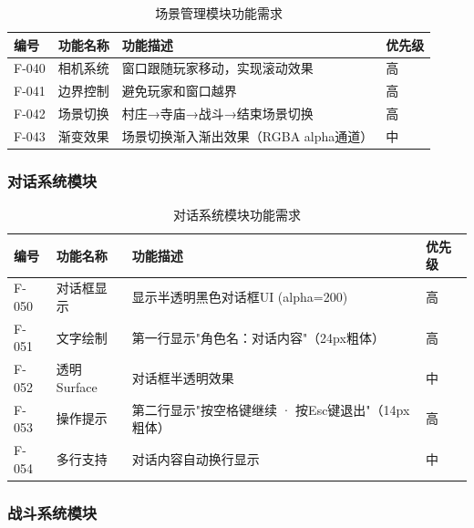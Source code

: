 \documentclass[12pt,a4paper]{article}
\begin{document}
\begin{table}[H]
\centering
\caption{场景管理模块功能需求}
\renewcommand{\arraystretch}{1.3}
\begin{tabularx}{\textwidth}{>{\centering\arraybackslash}m{2cm}>{\centering\arraybackslash}m{3cm}>{\centering\arraybackslash}m{5cm}>{\centering\arraybackslash}m{2cm}}
\toprule
\textbf{编号} & \textbf{功能名称} & \textbf{功能描述} & \textbf{优先级} \\
\midrule
F-040 & 相机系统 & 窗口跟随玩家移动，实现滚动效果 & 高 \\
F-041 & 边界控制 & 避免玩家和窗口越界 & 高 \\
F-042 & 场景切换 & 村庄→寺庙→战斗→结束场景切换 & 高 \\
F-043 & 渐变效果 & 场景切换渐入渐出效果（RGBA alpha通道） & 中 \\
\bottomrule
\end{tabularx}
\end{table}

\subsubsection{对话系统模块}

\begin{table}[H]
\centering
\caption{对话系统模块功能需求}
\renewcommand{\arraystretch}{1.3}
\begin{tabularx}{\textwidth}{>{\centering\arraybackslash}m{2cm}>{\centering\arraybackslash}m{3cm}>{\centering\arraybackslash}m{5cm}>{\centering\arraybackslash}m{2cm}}
\toprule
\textbf{编号} & \textbf{功能名称} & \textbf{功能描述} & \textbf{优先级} \\
\midrule
F-050 & 对话框显示 & 显示半透明黑色对话框UI (alpha=200) & 高 \\
F-051 & 文字绘制 & 第一行显示"角色名：对话内容"（24px粗体） & 高 \\
F-052 & 透明Surface & 对话框半透明效果 & 中 \\
F-053 & 操作提示 & 第二行显示"按空格键继续 · 按Esc键退出"（14px粗体） & 高 \\
F-054 & 多行支持 & 对话内容自动换行显示 & 中 \\
\bottomrule
\end{tabularx}
\end{table}

\subsubsection{战斗系统模块}
\end{document}
